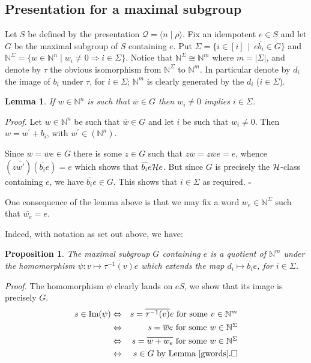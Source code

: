 \documentclass[12pt]{article}
\newtheorem{lemma}{\bf Lemma}
\newtheorem{proposition}{\bf Proposition}
\begin{document}
\subsection{Presentation for a maximal subgroup}\label{s:maxsubgrp}

Let $S$ be defined by the presentation 
${\mathcal Q}=\langle n\mid \rho\rangle$.
Fix an idempotent $e\in S$ and let $G$ be the maximal subgroup
of $S$ containing $e$. Put  $\Sigma=\{i\in [i]\,\mid\,e\overline{b_i}\in G\}$
and $\mathbb{N}^{\Sigma}=\{w\in\mathbb{N}^n\mid w_i\neq 0\Rightarrow i
\in\Sigma\}$. Notice that $\mathbb{N}^{\Sigma}\cong\mathbb{N}^m$
where $m=|\Sigma|$, and denote by $\tau$ the obvious
isomorphism from $\mathbb{N}^{\Sigma}$ to $\mathbb{N}^m$.
In particular denote by $d_i$ the image of $b_i$ under $\tau$,
for $i\in\Sigma$; $\mathbb{N}^m$ is clearly generated by the $d_i$
($i\in\Sigma$).

\begin{lemma}\label{gwords}
If $w\in \mathbb{N}^n$ is such that $\overline{w}\in G$ then
$w_i \neq 0$ implies $i\in\Sigma$.
\end{lemma}
\emph{Proof.}
Let $w\in \mathbb{N}^n$ be such that $\overline{w}\in G$ and let $i$ be 
such that $w_i\neq 0$. Then $w=w^{\prime}+b_i$, with $w^{\prime}\in
(\mathbb{N}^n)$.

Since $\overline{w} = \overline{w}e \in G$  there is some
$z \in G$ such that $z \overline{w} = z \overline{w} e = e$,
whence $(z \overline{w'}) (\overline{b_i} e) = e$ which shows that
$\overline{b_i} e {\cal H} e$. But since $G$ is precisely the 
${\cal H}$-class containing $e$, we have $\overline{b_i}e \in G$.    
This shows that $i \in \Sigma$ as required.  $\square$

One consequence of the lemma above is that we may fix a 
word $w_e\in\mathbb{N}^{\Sigma}$ such that $\overline{w_e}=e$. 

Indeed, with notation as set out above, we have:

\begin{proposition}\label{p:ggens}
The maximal subgroup $G$ containing $e$ is a quotient of 
$\mathbb{N}^m$ under the homomorphism
$\psi: v \mapsto \overline{\tau^{-1}(v)}e$ which extends the map
$d_i \mapsto \overline{b_i} e$, for $i \in \Sigma$.
\end{proposition}
\emph{Proof.}
The homomorphism $\psi$ clearly lands on $eS$, we show that
its image is precisely $G$.
\begin{eqnarray*}
s \in \mbox{Im}(\psi) & \Leftrightarrow & s = \overline{\tau^{-1}(v)}e \mbox{
for some $v \in \mathbb{N}^m$} \\
&\Leftrightarrow & s = \overline{w}e \mbox{ for some $w \in
\mathbb{N}^\Sigma$}\\
&\Leftrightarrow & s = \overline{w + w_e} \mbox{ for some $w \in
\mathbb{N}^\Sigma$}\\
&\Leftrightarrow & s \in G \mbox{ by Lemma \ref{gwords}.}\square
\end{eqnarray*}
\end{document}

